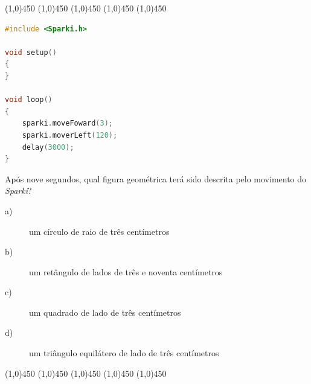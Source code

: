     \begin{center}
        \line(1,0){450}
        \vspace{0.2cm}   
        \line(1,0){450}
        \vspace{0.2cm}   
        \line(1,0){450}
        \vspace{0.2cm}   
        \line(1,0){450}
        \vspace{0.2cm}   
        \line(1,0){450}
        \vspace{0.4cm} 
    \end{center}
    
    
    \begin{lstlisting}[language=C]
#include <Sparki.h>

void setup()
{
}

void loop()
{
    sparki.moveFoward(3);
    sparki.moverLeft(120);
    delay(3000);
}
\end{lstlisting}

    Após nove segundos, qual figura geométrica terá sido descrita pelo movimento do \textsl{Sparki}?
    \begin{description}
    \item[a)] um círculo de raio de três centímetros
    \item[b)] um retângulo de lados de três e noventa centímetros
    \item[c)] um quadrado de lado de três centímetros
    \item[d)] um triângulo equilátero de lado de três centímetros
    \end{description}
    

\begin{center}
    \line(1,0){450}
    \vspace{0.2cm}   
    \line(1,0){450}
    \vspace{0.2cm}   
    \line(1,0){450}
    \vspace{0.2cm}   
    \line(1,0){450}
    \vspace{0.2cm}   
    \line(1,0){450}
    \vspace{0.4cm} 
\end{center}

